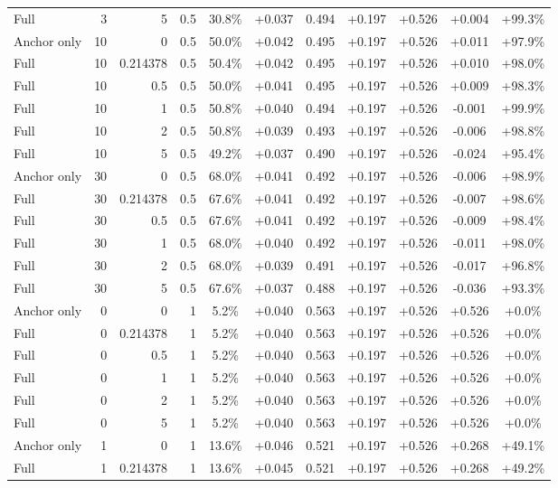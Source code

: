 \begin{table}[htbp]
\begin{tabular}{lrrrccccccc}
Full & 3 & 5 & 0.5 & 30.8\% & +0.037 & 0.494 & +0.197 & +0.526 & +0.004 & +99.3\% \\
Anchor only & 10 & 0 & 0.5 & 50.0\% & +0.042 & 0.495 & +0.197 & +0.526 & +0.011 & +97.9\% \\
Full & 10 & 0.214378 & 0.5 & 50.4\% & +0.042 & 0.495 & +0.197 & +0.526 & +0.010 & +98.0\% \\
Full & 10 & 0.5 & 0.5 & 50.0\% & +0.041 & 0.495 & +0.197 & +0.526 & +0.009 & +98.3\% \\
Full & 10 & 1 & 0.5 & 50.8\% & +0.040 & 0.494 & +0.197 & +0.526 & -0.001 & +99.9\% \\
Full & 10 & 2 & 0.5 & 50.8\% & +0.039 & 0.493 & +0.197 & +0.526 & -0.006 & +98.8\% \\
Full & 10 & 5 & 0.5 & 49.2\% & +0.037 & 0.490 & +0.197 & +0.526 & -0.024 & +95.4\% \\
Anchor only & 30 & 0 & 0.5 & 68.0\% & +0.041 & 0.492 & +0.197 & +0.526 & -0.006 & +98.9\% \\
Full & 30 & 0.214378 & 0.5 & 67.6\% & +0.041 & 0.492 & +0.197 & +0.526 & -0.007 & +98.6\% \\
Full & 30 & 0.5 & 0.5 & 67.6\% & +0.041 & 0.492 & +0.197 & +0.526 & -0.009 & +98.4\% \\
Full & 30 & 1 & 0.5 & 68.0\% & +0.040 & 0.492 & +0.197 & +0.526 & -0.011 & +98.0\% \\
Full & 30 & 2 & 0.5 & 68.0\% & +0.039 & 0.491 & +0.197 & +0.526 & -0.017 & +96.8\% \\
Full & 30 & 5 & 0.5 & 67.6\% & +0.037 & 0.488 & +0.197 & +0.526 & -0.036 & +93.3\% \\
Anchor only & 0 & 0 & 1 & 5.2\% & +0.040 & 0.563 & +0.197 & +0.526 & +0.526 & +0.0\% \\
Full & 0 & 0.214378 & 1 & 5.2\% & +0.040 & 0.563 & +0.197 & +0.526 & +0.526 & +0.0\% \\
Full & 0 & 0.5 & 1 & 5.2\% & +0.040 & 0.563 & +0.197 & +0.526 & +0.526 & +0.0\% \\
Full & 0 & 1 & 1 & 5.2\% & +0.040 & 0.563 & +0.197 & +0.526 & +0.526 & +0.0\% \\
Full & 0 & 2 & 1 & 5.2\% & +0.040 & 0.563 & +0.197 & +0.526 & +0.526 & +0.0\% \\
Full & 0 & 5 & 1 & 5.2\% & +0.040 & 0.563 & +0.197 & +0.526 & +0.526 & +0.0\% \\
Anchor only & 1 & 0 & 1 & 13.6\% & +0.046 & 0.521 & +0.197 & +0.526 & +0.268 & +49.1\% \\
Full & 1 & 0.214378 & 1 & 13.6\% & +0.045 & 0.521 & +0.197 & +0.526 & +0.268 & +49.2\% \\

\end{tabular}
\end{table}

